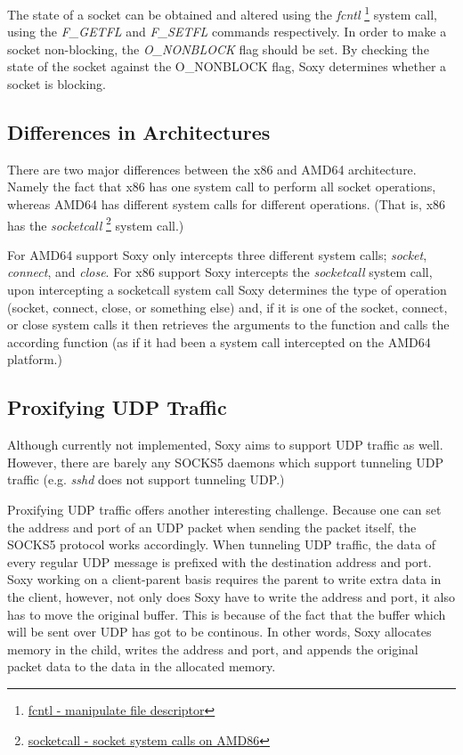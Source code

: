 \documentclass[a4paper, 10pt]{report}
\begin{document}
The state of a socket can be obtained and altered using the \textit{fcntl}
\footnote{\href{http://linux.die.net/man/2/fcntl}{fcntl - manipulate file
descriptor}} system call, using the \textit{F\_GETFL} and \textit{F\_SETFL}
commands respectively. In order to make a socket non-blocking, the
\textit{O\_NONBLOCK} flag should be set. By checking the state of the socket
against the O\_NONBLOCK flag, Soxy determines whether a socket is blocking.

\subsection{Differences in Architectures}
\label{soxy-arch-diff}

There are two major differences between the x86 and AMD64 architecture. Namely
the fact that x86 has one system call to perform all socket operations,
whereas AMD64 has different system calls for different operations.
(That is, x86 has the \textit{socketcall}
\footnote{\href{http://linux.die.net/man/2/socketcall}{socketcall - socket
system calls on AMD86}} system call.)

For AMD64 support Soxy only intercepts three different system calls;
\textit{socket}, \textit{connect}, and \textit{close}. For x86 support Soxy
intercepts the \textit{socketcall} system call, upon intercepting a
socketcall system call Soxy determines the type of operation (socket, connect,
close, or something else) and, if it is one of the socket, connect, or close
system calls it then retrieves the arguments to the function and calls the
according function (as if it had been a system call intercepted on the AMD64 
platform.)


\subsection{Proxifying UDP Traffic}

Although currently not implemented, Soxy aims to support UDP traffic as well.
However, there are barely any SOCKS5 daemons which support tunneling UDP
traffic (e.g. \textit{sshd} does not support tunneling UDP.)

Proxifying UDP traffic offers another interesting challenge. Because one can
set the address and port of an UDP packet when sending the packet itself, the
SOCKS5 protocol works accordingly. When tunneling UDP traffic, the data of
every regular UDP message is prefixed with the destination address and port.
Soxy working on a client-parent basis requires the parent to write extra data
in the client, however, not only does Soxy have to write the address and port,
it also has to move the original buffer. This is because of the fact that the
buffer which will be sent over UDP has got to be continous. In other words,
Soxy allocates memory in the child, writes the address and port, and appends
the original packet data to the data in the allocated memory.
\end{document}
